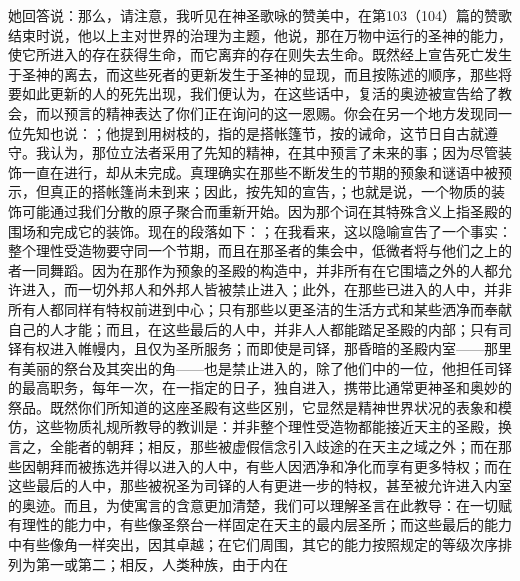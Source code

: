 她回答说：\newline{}那么，请注意，我听见在神圣歌咏的赞美中，在第103（104）篇的赞歌结束时说，他以上主对世界的治理为主题，\newline{}他说，那在万物中运行的圣神的能力，使它所进入的存在获得生命，而它离弃的存在则失去生命。\newline{}既然经上宣告死亡发生于圣神的离去，而这些死者的更新发生于圣神的显现，而且按陈述的顺序，那些将要如此更新的人的死先出现，我们便认为，在这些话中，复活的奥迹被宣告给了教会，而以预言的精神表达了你们正在询问的这一恩赐。\newline{}你会在另一个地方发现同一位先知也说：；他提到用树枝的，指的是搭帐篷节，按的诫命，这节日自古就遵守。\newline{}我认为，那位立法者采用了先知的精神，在其中预言了未来的事；因为尽管装饰一直在进行，却从未完成。\newline{}真理确实在那些不断发生的节期的预象和谜语中被预示，但真正的搭帐篷尚未到来；因此，按先知的宣告，；也就是说，一个物质的装饰可能通过我们分散的原子聚合而重新开始。\newline{}因为那个词在其特殊含义上指圣殿的围场和完成它的装饰。\newline{}现在的段落如下：；在我看来，这以隐喻宣告了一个事实：整个理性受造物要守同一个节期，而且在那圣者的集会中，低微者将与他们之上的者一同舞蹈。\newline{}因为在那作为预象的圣殿的构造中，并非所有在它围墙之外的人都允许进入，而一切外邦人和外邦人皆被禁止进入；此外，在那些已进入的人中，并非所有人都同样有特权前进到中心；只有那些以更圣洁的生活方式和某些洒净而奉献自己的人才能；而且，在这些最后的人中，并非人人都能踏足圣殿的内部；只有司铎有权进入帷幔内，且仅为圣所服务；而即使是司铎，那昏暗的圣殿内室——那里有美丽的祭台及其突出的角——也是禁止进入的，除了他们中的一位，他担任司铎的最高职务，每年一次，在一指定的日子，独自进入，携带比通常更神圣和奥妙的祭品。\newline{}既然你们所知道的这座圣殿有这些区别，它显然是精神世界状况的表象和模仿，这些物质礼规所教导的教训是：并非整个理性受造物都能接近天主的圣殿，换言之，全能者的朝拜；相反，那些被虚假信念引入歧途的在天主之域之外；而在那些因朝拜而被拣选并得以进入的人中，有些人因洒净和净化而享有更多特权；而在这些最后的人中，那些被祝圣为司铎的人有更进一步的特权，甚至被允许进入内室的奥迹。\newline{}而且，为使寓言的含意更加清楚，我们可以理解圣言在此教导：在一切赋有理性的能力中，有些像圣祭台一样固定在天主的最内层圣所；而这些最后的能力中有些像角一样突出，因其卓越；在它们周围，其它的能力按照规定的等级次序排列为第一或第二；相反，人类种族，由于内在